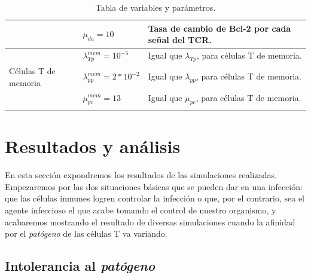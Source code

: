 \begin{table}[h]
\begin{center}
\begin{tabular}{>{\centering\arraybackslash}m{2cm} >{\arraybackslash}m{3cm} >{\arraybackslash}m{7cm} }
			& $\mu_{da} = 10$                 & Tasa de cambio de Bcl-2 por cada señal del TCR.           \\ \hline
			\multirow{4}{*}{} & $\lambda_{Tp}^{mem} = 10^{-5}$   & Igual que $\lambda_{Tp}$, para células T de memoria.      \\ \cline{2-3}
			Células T de memoria        & $\lambda_{pp}^{mem} = 2*10^{-2}$ & Igual que $\lambda_{pp}$, para células T de memoria.      \\ \cline{2-3}
			& $\mu_{pc}^{mem} = 13$           & Igual que $\mu_{pc}$, para células T de memoria.          \\ \cline{2-3}\hline
		\end{tabular}
		\caption{Tabla de variables y parámetros.}
		\label{tabla:param}
	\end{center}
\end{table}

\section{Resultados y análisis}

En esta sección expondremos los resultados de las simulaciones realizadas. Empezaremos por las dos situaciones básicas que se pueden dar en una infección: que las células inmunes logren controlar la infección o que, por el contrario, sea el agente infeccioso el que acabe tomando el control de nuestro organismo, y acabaremos mostrando el resultado de diversas simulaciones cuando la afinidad por el \textit{patógeno} de las células T va variando.

\subsection{Intolerancia al \textit{patógeno}}
\label{sim:intoler}


